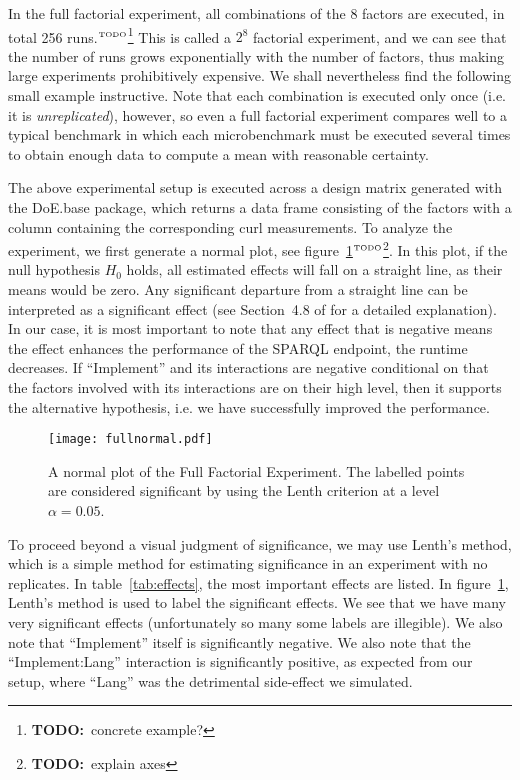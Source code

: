 \documentclass{llncs}
\newcommand{\todo}[1]{\ensuremath{^{\textrm{\tiny{TODO}\normalsize}}}\footnote{\textbf{TODO:}~#1}}
\begin{document}
In the full factorial experiment, all combinations of the 8 factors
are executed, in total 256 runs.\todo{concrete example?} This is
called a $2^8$ factorial experiment, and we can see that the number of
runs grows exponentially with the number of factors, thus making
large experiments prohibitively expensive. We shall nevertheless find
the following small example instructive. Note that each combination is
executed only once (i.e. it is \emph{unreplicated}), however, so even a
full factorial experiment compares well to a typical benchmark in
which each microbenchmark must be executed several times to obtain
enough data to compute a mean with reasonable certainty.

The above experimental setup is executed across a design matrix
generated with the DoE.base package, which returns a data frame
consisting of the factors with a column containing the corresponding
curl measurements. To analyze the experiment, we first generate a
normal plot, see figure~\ref{fig:fullnormal}\todo{explain axes}. In this plot, if the
null hypothesis $H_0$ holds, all estimated effects will fall on a
straight line, as their means would be zero. Any significant departure
from a straight line can be interpreted as a significant effect (see
Section~4.8 of \cite{wu2009experiments} for a detailed
explanation). In our case, it is most important to note that any
effect that is negative means the effect
enhances the performance of the SPARQL endpoint, the runtime
decreases. If ``Implement'' and its interactions are negative conditional on that
the factors involved with its interactions are on their high level,
then it supports the alternative hypothesis, i.e. we have successfully
improved the performance.

\begin{figure}[h!]
  \texttt{[image: fullnormal.pdf]}
  \caption{A normal plot of the Full Factorial Experiment. The
    labelled points are considered significant by using the Lenth
    criterion at a level $\alpha=0.05$.}\label{fig:fullnormal}
\end{figure}


To proceed beyond a visual judgment of significance, we may use
Lenth's method\cite{lenthmethod}, which is a simple method for
estimating significance in an experiment with no replicates. In
table~\ref{tab:effects}, the most important effects are listed.  In
figure~\ref{fig:fullnormal}, Lenth's method is used to label the
significant effects. We see that we have many very significant effects
(unfortunately so many some labels are illegible). We also note that
``Implement'' itself is significantly negative. We also note that the
``Implement:Lang'' interaction is significantly positive, as expected
from our setup, where ``Lang'' was the detrimental side-effect we
simulated.
\end{document}
